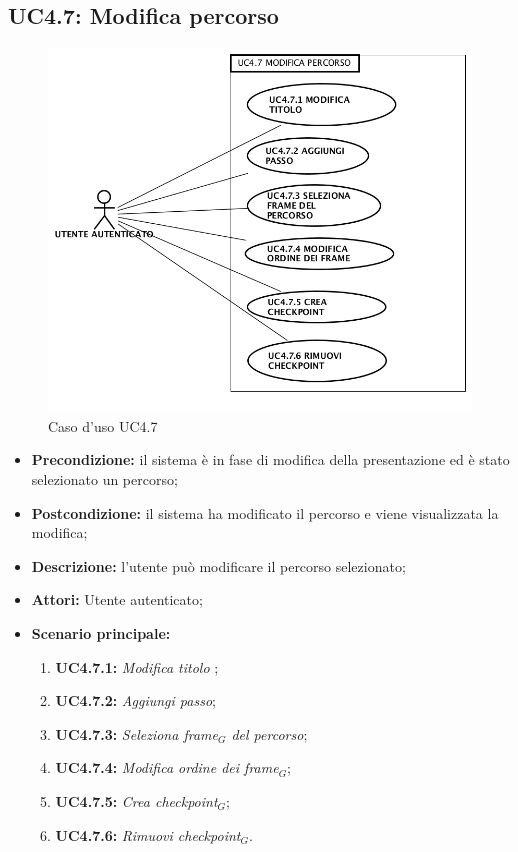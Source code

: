 \subsection{ UC4.7: Modifica percorso}

\begin{figure}[h]
	\begin{center}
	\includegraphics[scale=0.4]{diagram/UC4-7.png}
	\caption{Caso d'uso UC4.7}
	\end{center}
\end{figure}
\begin{itemize}
	\item \textbf{Precondizione:} il sistema è in fase di modifica della presentazione ed è stato selezionato un percorso;
	\item \textbf{Postcondizione:} il sistema ha modificato il percorso e viene visualizzata la modifica;
	\item \textbf{Descrizione:} l'utente può modificare il percorso selezionato;
	\item \textbf{Attori:} Utente autenticato;
	\item \textbf{Scenario principale:}
	\begin{enumerate}
		\item \textbf{ UC4.7.1:} \textit{ Modifica titolo };
		\item \textbf{ UC4.7.2:} \textit{ Aggiungi passo};
		\item \textbf{ UC4.7.3:} \textit{ Seleziona frame$_G$ del percorso};
		\item \textbf{ UC4.7.4:} \textit{ Modifica ordine dei frame$_G$};
		\item \textbf{ UC4.7.5:} \textit{ Crea checkpoint$_G$};
		\item \textbf{ UC4.7.6:} \textit{ Rimuovi checkpoint$_G$}.
	\end{enumerate}
\end{itemize}
